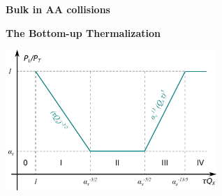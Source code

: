 \documentclass[9pt,a4paper,unknownkeysallowed,xcolor=dvipsnames,aspectratio=43]{beamer}
\begin{document}
%
\setcounter{page}{0}
\begin{frame}
\vspace*{\fill}
\begin{center}
{\Huge\bf\color{gray} Bulk in AA collisions}
\end{center}
\vspace*{\fill}
\end{frame}
%
%
\setcounter{page}{4}
\begin{frame}{\bf\huge The Bottom-up Thermalization}	\vspace{2mm}
\begin{center}
\includegraphics[width=0.6\textwidth]{fig/PLoPT}\\
\vspace{4mm}

\end{center}
\end{frame}
\end{document}
